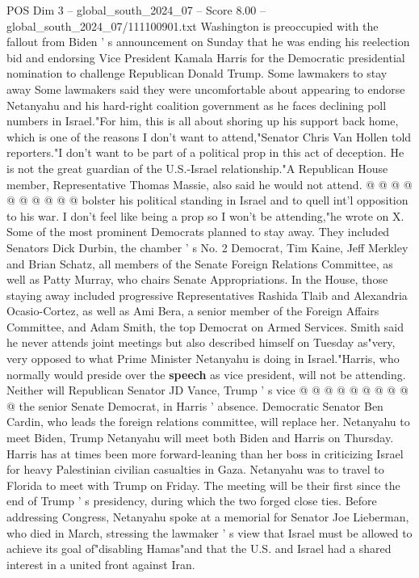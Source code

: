 \begin{textsample}{POS Dim 3 – global\_south\_2024\_07 – Score 8.00 – global\_south\_2024\_07/111100901.txt}
Washington is preoccupied with the fallout from Biden ' s announcement on Sunday that he was ending his reelection bid and endorsing Vice President Kamala Harris for the Democratic presidential nomination to challenge Republican Donald Trump.
Some lawmakers to stay away Some lawmakers said they were uncomfortable about appearing to endorse Netanyahu and his hard-right coalition government as he faces declining poll numbers in Israel."For him, this is all about shoring up his support back home, which is one of the reasons I don't want to attend,"Senator Chris Van Hollen told reporters."I don't want to be part of a political prop in this act of deception.
He is not the great guardian of the U.S.-Israel relationship."A Republican House member, Representative Thomas Massie, also said he would not attend. @ @ @ @ @ @ @ @ @ @ bolster his political standing in Israel and to quell int'l opposition to his war.
I don't feel like being a prop so I won't be attending,"he wrote on X.
Some of the most prominent Democrats planned to stay away.
They included Senators Dick Durbin, the chamber ' s No. 2 Democrat, Tim Kaine, Jeff Merkley and Brian Schatz, all members of the Senate Foreign Relations Committee, as well as Patty Murray, who chairs Senate Appropriations.
In the House, those staying away included progressive Representatives Rashida Tlaib and Alexandria Ocasio-Cortez, as well as Ami Bera, a senior member of the Foreign Affairs Committee, and Adam Smith, the top Democrat on Armed Services.
Smith said he never attends joint meetings but also described himself on Tuesday as"very, very opposed to what Prime Minister Netanyahu is doing in Israel."Harris, who normally would preside over the \textbf{speech} as vice president, will not be attending.
Neither will Republican Senator JD Vance, Trump ' s vice @ @ @ @ @ @ @ @ @ @ the senior Senate Democrat, in Harris ' absence.
Democratic Senator Ben Cardin, who leads the foreign relations committee, will replace her.
Netanyahu to meet Biden, Trump Netanyahu will meet both Biden and Harris on Thursday.
Harris has at times been more forward-leaning than her boss in criticizing Israel for heavy Palestinian civilian casualties in Gaza.
Netanyahu was to travel to Florida to meet with Trump on Friday.
The meeting will be their first since the end of Trump ' s presidency, during which the two forged close ties.
Before addressing Congress, Netanyahu spoke at a memorial for Senator Joe Lieberman, who died in March, stressing the lawmaker ' s view that Israel must be allowed to achieve its goal of"disabling Hamas"and that the U.S. and Israel had a shared interest in a united front against Iran.

\end{textsample}
